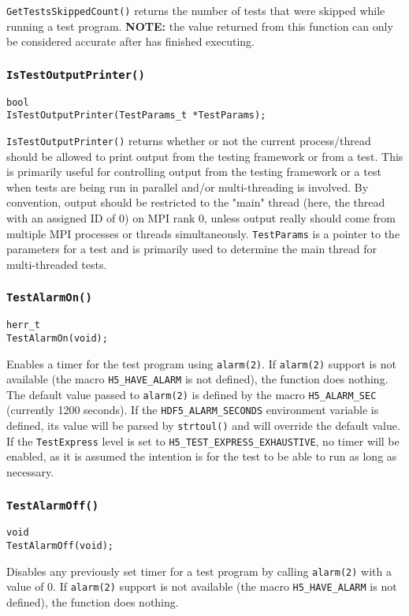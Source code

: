 \documentclass[../HDF5_RFC.tex]{subfiles}
\begin{document}
\texttt{GetTestsSkippedCount()} returns the number of tests that were skipped while running a test
program. \textbf{NOTE:} the value returned from this function can only be considered accurate
after  has finished executing.

\subsubsection{\texttt{IsTestOutputPrinter()}}

\begin{verbatim}
bool
IsTestOutputPrinter(TestParams_t *TestParams);
\end{verbatim}

\texttt{IsTestOutputPrinter()} returns whether or not the current process/thread should be allowed
to print output from the testing framework or from a test. This is primarily useful for controlling
output from the testing framework or a test when tests are being run in parallel and/or multi-threading
is involved. By convention, output should be restricted to the "main" thread (here, the thread with an
assigned ID of 0) on MPI rank 0, unless output really should come from multiple MPI processes or threads
simultaneously. \texttt{TestParams} is a pointer to the parameters for a test and is primarily used to
determine the main thread for multi-threaded tests.

\subsubsection{\texttt{TestAlarmOn()}}
\label{apdx:testframe_testalarmon}

\begin{verbatim}
herr_t
TestAlarmOn(void);
\end{verbatim}

Enables a timer for the test program using \texttt{alarm(2)}. If \texttt{alarm(2)} support is not available
(the macro \texttt{H5\_HAVE\_ALARM} is not defined), the function does nothing. The default value passed to \texttt{alarm(2)} is defined by the macro \texttt{H5\_ALARM\_SEC} (currently 1200 seconds). If the
\texttt{HDF5\_ALARM\_SECONDS} environment variable is defined, its value will be parsed by
\texttt{strtoul()} and will override the default value. If the \texttt{TestExpress} level is set to
\texttt{H5\_TEST\_EXPRESS\_EXHAUSTIVE}, no timer will be enabled, as it is assumed the intention is for
the test to be able to run as long as necessary.

\subsubsection{\texttt{TestAlarmOff()}}
\label{apdx:testframe_testalarmoff}

\begin{verbatim}
void
TestAlarmOff(void);
\end{verbatim}

Disables any previously set timer for a test program by calling \texttt{alarm(2)} with a value of 0. If
\texttt{alarm(2)} support is not available (the macro \texttt{H5\_HAVE\_ALARM} is not defined), the
function does nothing.
\end{document}
